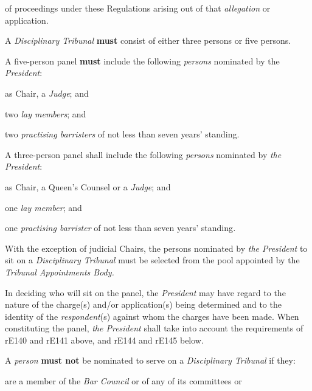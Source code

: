 of proceedings under these Regulations arising out of
that \emph{allegation} or application.\\
\par
{}
A \emph{Disciplinary Tribunal}  \textcolor{myred}{\textbf{must}} consist of either three persons or
five persons.\\
\par
A five-person panel  \textcolor{myred}{\textbf{must}} include the following \emph{persons} nominated
by the \emph{President}:\\\nl \item as Chair, a \emph{Judge}; and\item two \emph{lay members}; and\item two \emph{practising barristers} of not less than seven years'
standing.\\
\par
A three-person panel shall include the
following \emph{persons} nominated by \emph{the President}:\\\nl \item as Chair, a Queen's Counsel or a \emph{Judge}; and\item one \emph{lay member}; and\item one \emph{practising barrister }of not less than seven years'
standing\emph{.}\ln
{}\par
With the exception of judicial Chairs, the persons nominated
by \emph{the President }to sit on a \emph{Disciplinary Tribunal }must be
selected from the pool appointed by the \emph{Tribunal Appointments
Body.}\par
{}\par
In deciding who will sit on the panel, the \emph{President} may have
regard to the nature of the charge(s) and/or application(s) being
determined and to the identity of the \emph{respondent}(s) against whom
the charges have been made. When constituting the panel, \emph{the
President }shall take into account the requirements of rE140 and rE141
above, and rE144 and rE145 below.\\
\par
A \emph{person}  \textcolor{myred}{\textbf{must not}} be nominated to serve on a \emph{Disciplinary
Tribunal} if they:\\\nl \item are a member of the \emph{Bar Council }or of any of its committees or
